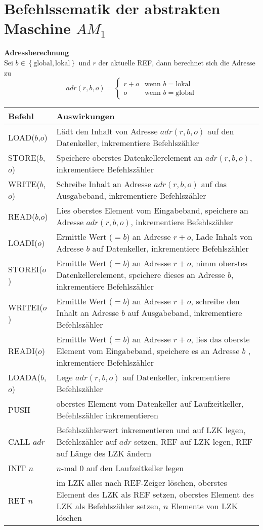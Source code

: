 \documentclass[ngerman,a4paper, 12pt]{article}
\newcommand*\head{\rowfont{\bfseries}}
\newcommand{\menge}[1]{\left\{ #1 \right\}}
\begin{document}
	\pagestyle{empty}
	
	\section*{Befehlssematik der abstrakten Maschine $AM_1$}
	
	\textbf{Adressberechnung} \\
	Sei $b \in \menge{\text{global}, \text{lokal}}$ und $r$ der aktuelle REF, dann berechnet sich die Adresse zu
	\begin{equation*}
	adr(r,b,o) = \begin{cases}
	r+o & \text{wenn } b = \text{lokal} \\
	o & \text{wenn } b = \text{global}
	\end{cases}
	\end{equation*}
	
	\renewcommand*{\arraystretch}{1.6}
	\noindent
	\begin{tabu}{p{2.5cm} | p{\dimexpr\linewidth-2.5cm}}
		\toprule
		\head Befehl & Auswirkungen  \\ 
		\midrule \midrule
		LOAD($b$,$o$) & Lädt den Inhalt von Adresse $adr(r,b,o)$ auf den Datenkeller, inkrementiere Befehlszähler \\
		STORE($b$,$o$) & Speichere oberstes Datenkellerelement an $adr(r,b,o)$, inkrementiere Befehlszähler \\
		WRITE($b$,$o$) & Schreibe Inhalt an Adresse $adr(r,b,o)$ auf das
		Ausgabeband, inkrementiere Befehlszähler \\
		READ($b$,$o$) & Lies oberstes Element vom Eingabeband, speichere
		an Adresse $adr(r,b,o)$, inkrementiere Befehlszähler \\
		LOADI($o$) & Ermittle Wert ($=b$) an Adresse $r+o$, Lade Inhalt
		von Adresse $b$ auf Datenkeller, inkrementiere Befehlszähler \\
		STOREI($o$) & Ermittle Wert ($=b$) an Adresse $r+o$, nimm
		oberstes Datenkellerelement, speichere dieses an
		Adresse $b$, inkrementiere Befehlszähler \\
		WRITEI($o$) & Ermittle Wert ($=b$) an Adresse $r+o$, schreibe den
		Inhalt an Adresse $b$ auf Ausgabeband, inkrementiere Befehlszähler \\
		READI($o$) & Ermittle Wert ($=b$) an Adresse $r+o$, lies das oberste
		Element vom Eingabeband, speichere es an Adresse $b$ , inkrementiere Befehlszähler \\
		LOADA($b$,$o$) & Lege $adr(r,b,o)$ auf Datenkeller, inkrementiere Befehlszähler \\			
		PUSH & oberstes Element vom Datenkeller auf Laufzeitkeller, Befehlszähler inkrementieren \\
		CALL $adr$ & Befehlszählerwert inkrementieren und auf LZK legen, Befehlszähler auf $adr$ setzen, REF auf LZK legen, REF auf Länge des LZK ändern \\
		INIT $n$ & $n$-mal $0$ auf den Laufzeitkeller legen \\
		RET $n$ & im LZK alles nach REF-Zeiger löschen, oberstes Element des LZK als REF setzen, oberstes Element des LZK als Befehlszähler setzen, $n$ Elemente von LZK löschen \\
		\bottomrule
	\end{tabu}
\end{document}
